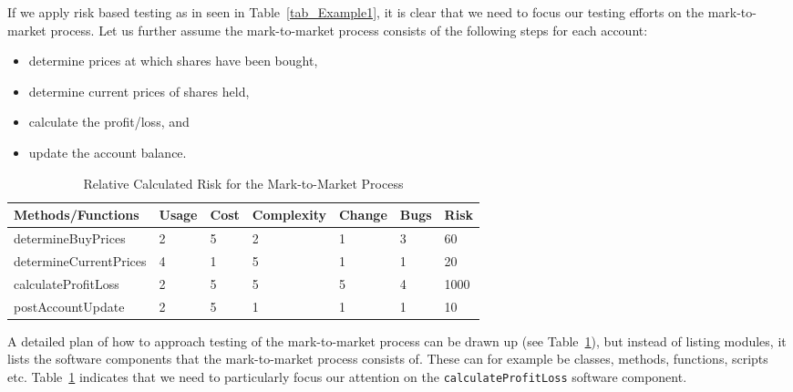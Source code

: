 \documentclass{amsart}
\begin{document}
If we apply risk based testing as in seen in Table~\ref{tab_Example1}, it is clear that we need to focus our testing efforts on the mark-to-market process. Let us further assume the mark-to-market process consists of the following steps for each account:
\begin{itemize}
	\item determine prices at which shares have been bought,
	\item determine current prices of shares held,
	\item calculate the profit/loss, and
	\item update the account balance.
\end{itemize}


\begin{table}
	\footnotesize
	\begin{center} 
		\caption{Relative Calculated Risk for the Mark-to-Market Process}
		\label{tab_Example2}
		\smallskip
		\begin{tabular}{|>{\footnotesize}p{3.5cm}|>{\footnotesize}p{0.75cm}|>{\footnotesize}p{0.75cm}|>{\footnotesize}p{1.75cm}|>{\footnotesize}p{1.25cm}|>{\footnotesize}p{0.75cm}|>{\footnotesize}p{0.75cm}|}
			\hline
			\textbf{Methods/Functions} & \textbf{Usage} & \textbf{Cost} & \textbf{Complexity} & \textbf{Change} & \textbf{Bugs} & \textbf{Risk} \\
			\hline
			determineBuyPrices & 2 & 5 & 2 & 1 & 3 & 60\\
			determineCurrentPrices & 4 & 1 & 5 & 1 & 1 & 20 \\
			calculateProfitLoss & 2 & 5 & 5 & 5 & 4 & 1000\\
			postAccountUpdate & 2 & 5 & 1 & 1 & 1 & 10\\
			\hline
		\end{tabular}
	\end{center}
	\normalsize
\end{table} 


A detailed plan of how to approach testing of the mark-to-market process can be drawn up (see Table~\ref{tab_Example2}), but instead of listing modules, it lists the software components that the mark-to-market process consists of. These can for example be classes, methods, functions, scripts etc. Table~\ref{tab_Example2} indicates that we need to particularly focus our attention on the \texttt{calculateProfitLoss} software component.
\end{document}
